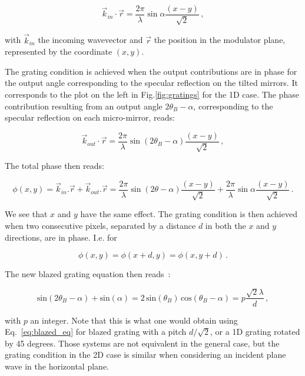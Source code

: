 \documentclass[12pt]{iopart}
\begin{document}
\begin{equation}
{\vec{k}_{in}\cdot\vec{r}} = {\frac{2\pi}{\lambda}\sin\alpha \frac{\left(x - y\right)}{\sqrt{2}}}
\, ,
\end{equation}

with $\vec{k}_{in}$ the incoming wavevector and $\vec{r}$ the position in the modulator plane, 
represented by the coordinate $(x,y)$.

The grating condition is achieved when the output contributions are in phase 
for the output angle corresponding to the specular reflection on the tilted mirrors. 
It corresponds to the plot on the left in Fig.\ref{fig:gratings} for the 1D case.
The phase contribution resulting from an output angle $2\theta_B-\alpha$, 
corresponding to the specular reflection on each micro-mirror,
reads:

\begin{equation}
\vec{k}_{out}\cdot\vec{r} 
= {\frac{2\pi}{\lambda}\sin\left(2\theta_B - \alpha\right) \frac{\left(x - y\right)}{\sqrt{2}}}
\, ,
\end{equation}

The total phase then reads:

\begin{equation}
\phi(x,y) = \vec{k}_{in}.\vec{r}  + \vec{k}_{out}.\vec{r} =  
{\frac{2\pi}{\lambda}\sin\left(2\theta - \alpha\right) \frac{\left(x - y\right)}{\sqrt{2}}} +
{\frac{2\pi}{\lambda}\sin\alpha \frac{\left(x - y\right)}{\sqrt{2}}} 
\, .
\end{equation}




We see that $x$ and $y$ have the same effect.
The grating condition is then achieved when two consecutive pixels, 
separated by a distance $d$ in both the $x$ and $y$ directions, are in phase.
I.e. for

\begin{equation}
  \phi(x,y) = \phi(x+d,y) = \phi(x,y+d) \, .
\end{equation}

The new blazed grating equation then reads~:

\begin{equation}
  \text{sin}(2\theta_B-\alpha) + \text{sin}(\alpha)
  = 2 \,\text{sin}(\theta_B)  \,\text{cos}(\theta_B-\alpha)
  = p\frac{\sqrt{2}\lambda}{d} \, ,
  \label{eq:blazed_eq_new}
\end{equation}

with $p$ an integer.
Note that this is what one would obtain using Eq.~\ref{eq:blazed_eq} for 
blazed grating with a pitch $d/\sqrt{2}$, or a 1D grating rotated by 45 degrees.
Those systems are not equivalent in the general case, 
but the grating condition in the 2D case is
similar when considering an incident plane wave in the horizontal plane.\\
\end{document}
